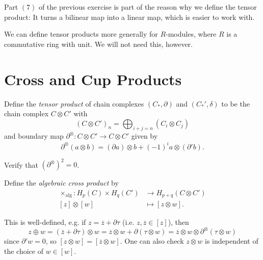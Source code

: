 \begin{remark}
  Part $(7)$ of the previous exercise is
  part of the reason why we define the tensor
  product: It turns a bilinear map into a linear
  map, which is easier to work with.
\end{remark}

\begin{remark}
  We can define tensor products more generally
  for $R$-modules, where $R$ is a
  commutative ring with unit. We will not
  need this, however.
\end{remark}

\section{Cross and Cup Products}
\begin{definition}
  Define the \emph{tensor product} of
  chain complexes $(C_*, \partial)$ and
  $(C_*', \delta)$ to be the chain complex
  $C \otimes C'$ with
  \[
    (C \otimes C')_n = \bigoplus_{i + j = n} (C_i \otimes C_j)
  \]
  and boundary map $\partial^\otimes : C \otimes C' \to C \otimes C'$
  given by
  \[
    \partial^\otimes(a \otimes b)
    = (\partial a) \otimes b + (-1)^i a \otimes (\partial' b).
  \]
\end{definition}

\begin{exercise}
  Verify that $(\partial^\otimes)^2 = 0$.
\end{exercise}

\begin{definition}
  Define the \emph{algebraic cross product} by
  \begin{align*}
    \times_{\mathrm{alg}} : H_p(C) \times H_q(C')
    &\longrightarrow H_{p + q}(C \otimes C') \\
    [z] \otimes [w] &\longmapsto [z \otimes w].
  \end{align*}
\end{definition}

\begin{remark}
  This is well-defined, e.g. if
  $z = \overline{z} + \partial \tau$ (i.e.
  $z, \overline{z} \in [z]$), then
  \[
    z \oplus w = (\overline{z} + \partial \tau) \otimes w
    = \overline{z} \otimes w + \partial(\tau \otimes w)
    = \overline{z} \otimes w \otimes \partial^\otimes(\tau \otimes w)
  \]
  since $\partial' w = 0$, so
  $[z \otimes w] = [\overline{z} \otimes w]$.
  One can also check $z \otimes w$ is
  independent of the choice of
  $w \in [w]$.
\end{remark}

